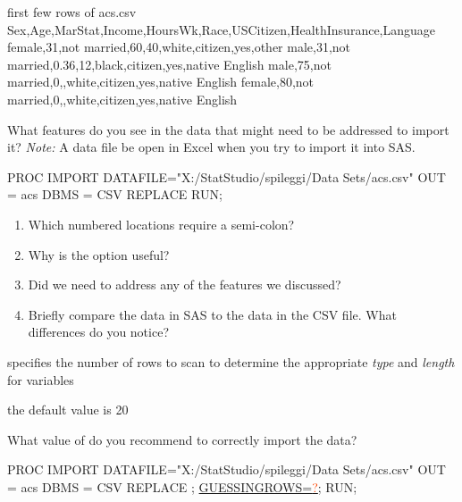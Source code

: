 \begin{frame}[fragile]
\hspace*{-0.3in}
\footnotesize
\begin{craw}{.0}{first few rows of acs.csv}
Sex,Age,MarStat,Income,HoursWk,Race,USCitizen,HealthInsurance,Language
female,31,not married,60,40,white,citizen,yes,other
male,31,not married,0.36,12,black,citizen,yes,native English
male,75,not married,0,,white,citizen,yes,native English
female,80,not married,0,,white,citizen,yes,native English
\end{craw}
\emp
\vskip20pt
\oyo What features do you see in the data that might need to be addressed to import it?
\vskip15pt
\emph{Note:} A data file \underline{} be open in Excel when you try to import it into SAS.
\end{frame}

\begin{frame}[fragile]
\footnotesize
\begin{code}{.0}
PROC IMPORT \textcolor{OrangeRed}{}
   DATAFILE="X:/StatStudio/spileggi/Data Sets/acs.csv" \textcolor{OrangeRed}{}
   OUT = acs \textcolor{OrangeRed}{}
   DBMS = CSV \textcolor{OrangeRed}{}
   REPLACE \textcolor{OrangeRed}{}
RUN;
\end{code}
\emp
\vskip10pt
\oyo
\begin{enumerate}
\item Which numbered locations require a semi-colon?
\item Why is the  option useful?
\item Did we need to address any of the features we discussed?
\item Briefly compare the data in SAS to the data in the CSV file.  What differences do you notice?
\end{enumerate}
\end{frame}

\begin{frame}[fragile]
\bi
\item {} specifies the number of rows to scan to determine the appropriate \emph{type} and \emph{length} for variables
\item the default value is 20
\item \oyo What value of  do you recommend to correctly import the data?

\ei
\vskip10pt
\footnotesize
\begin{code}{.0}
PROC IMPORT
   DATAFILE="X:/StatStudio/spileggi/Data Sets/acs.csv" 
   OUT = acs
   DBMS = CSV
   REPLACE ;
   \underline{GUESSINGROWS=\textcolor{OrangeRed}{?};}
RUN;
\end{code}
\emp
\end{frame}

